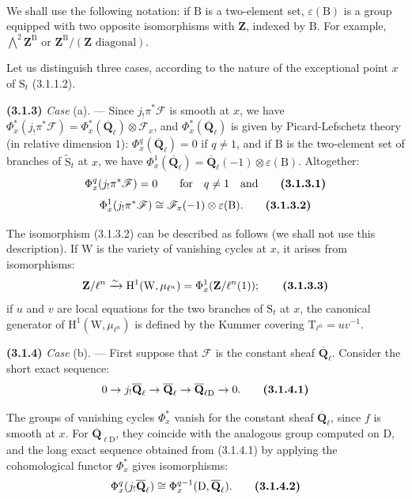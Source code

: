 \documentclass[11pt,leqno]{article}
\newcommand{\Page}[1]{\ifvmode\noindent\else\unskip\ \fi{\footnotesize\textcolor{gray}{[p.\,#1]}}\ \ignorespaces}
\begin{document}
\Page{199}

We shall use the following notation: if \(\mathrm B\) is a two-element set, \(\varepsilon(\mathrm B)\) is a group equipped with two opposite isomorphisms with \(\mathbf Z\), indexed by \(\mathrm B\). For example, \(\bigwedge\limits^{2}\mathbf Z^{\mathrm B}\) or \(\mathbf Z^{\mathrm B}/(\mathbf Z\text{ diagonal})\).

Let us distinguish three cases, according to the nature of the exceptional point \(x\) of \(\mathrm S_t\) (3.1.1.2).

\textbf{(3.1.3)} \textit{Case} (a). — Since \(j_!\pi^*\mathscr F\) is smooth at \(x\), we have \(\Phi_x^*(j_!\pi^*\mathscr F)=\Phi_x^*(\overline{\mathbf Q}_\ell)\otimes\mathscr F_x\), and \(\Phi_x^*(\overline{\mathbf Q}_\ell)\) is given by Picard-Lefschetz theory (in relative dimension \(1\)): \(\Phi_x^q(\overline{\mathbf Q}_\ell)=0\) if \(q\ne1\), and if \(\mathrm B\) is the two-element set of branches of \(\widetilde{\mathrm S}_t\) at \(x\), we have \(\Phi_x^1(\overline{\mathbf Q}_\ell)=\overline{\mathbf Q}_\ell(-1)\otimes\varepsilon(\mathrm B)\). Altogether:
\[
\Phi_x^q(j_!\pi^*\mathscr F)=0
\qquad\text{for}\quad q\ne1
\quad\text{and}
\tag*{\textbf{(3.1.3.1)}}
\]
\[
\Phi_x^1(j_!\pi^*\mathscr F)
\cong\mathscr F_x(-1)\otimes\varepsilon(\mathrm B).
\tag*{\textbf{(3.1.3.2)}}
\]

The isomorphism (3.1.3.2) can be described as follows (we shall not use this description). If \(\mathrm W\) is the variety of vanishing cycles at \(x\), it arises from isomorphisms:
\[
\mathbf Z/\ell^n
\xrightarrow{\sim}
\mathrm H^1(\mathrm W,\mu_{\ell^n})
=\Phi_x^1(\mathbf Z/\ell^n(1));
\tag*{\textbf{(3.1.3.3)}}
\]
if \(u\) and \(v\) are local equations for the two branches of \(\mathrm S_t\) at \(x\), the canonical generator of \(\mathrm H^1(\mathrm W,\mu_{\ell^n})\) is defined by the Kummer covering \(\mathrm T_{\ell^n}=uv^{-1}\).

\textbf{(3.1.4)} \textit{Case} (b). — First suppose that \(\mathscr F\) is the constant sheaf \(\overline{\mathbf Q}_\ell\). Consider the short exact sequence:
\[
0\to j_!\overline{\mathbf Q}_\ell
\to\overline{\mathbf Q}_\ell
\to\overline{\mathbf Q}_{\ell\mathrm D}\to0.
\tag*{\textbf{(3.1.4.1)}}
\]

The groups of vanishing cycles \(\Phi_x^*\) vanish for the constant sheaf \(\overline{\mathbf Q}_\ell\), since \(f\) is smooth at \(x\). For \(\overline{\mathbf Q}_{\ell\mathrm D}\), they coincide with the analogous group computed on \(\mathrm D\), and the long exact sequence obtained from (3.1.4.1) by applying the cohomological functor \(\Phi_x^*\) gives isomorphisms:
\[
\Phi_x^q(j_!\overline{\mathbf Q}_\ell)
\cong\Phi_x^{q-1}(\mathrm D,\overline{\mathbf Q}_\ell).
\tag*{\textbf{(3.1.4.2)}}
\]
\end{document}
